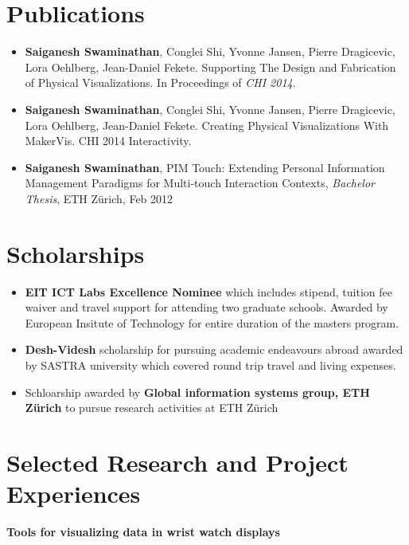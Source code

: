 \documentclass[11pt,a4paper,sans]{moderncv}   %
\begin{document}
\section{Publications}
\begin{itemize}
  \item  \textbf{Saiganesh Swaminathan}, Conglei Shi, Yvonne Jansen, Pierre Dragicevic, Lora Oehlberg, Jean-Daniel Fekete. Supporting The Design and Fabrication of Physical Visualizations. In Proceedings of \textit{CHI 2014}.\\
  
  \item   \textbf{Saiganesh Swaminathan}, Conglei Shi, Yvonne Jansen, Pierre Dragicevic, Lora Oehlberg, Jean-Daniel Fekete. Creating Physical Visualizations With MakerVis. CHI 2014 Interactivity.
  
  \item  \textbf{Saiganesh Swaminathan}, PIM Touch: Extending Personal Information Management Paradigms for Multi-touch Interaction Contexts, \emph{Bachelor Thesis}, ETH Z\"urich, Feb 2012 
  
   
\end{itemize}  

\section{Scholarships}
			\begin{itemize}
			  \item \textbf{\textsf{EIT ICT Labs Excellence Nominee}} which includes stipend, tuition fee waiver and travel support for attending two graduate schools. Awarded by European Insitute of Technology for entire duration of the masters program. 
				\medskip
				\item \textbf{\textsf{Desh-Videsh}} scholarship for pursuing academic endeavours abroad awarded by SASTRA university which covered round trip travel and living expenses.
				\medskip
				\item Schloarship awarded by \textbf{\textsf{Global information systems group, ETH Z\"urich}} to pursue research activities at ETH Z\"urich
			\end{itemize}

\section{Selected Research and Project Experiences}


 {\textbf{\textsf{Tools for visualizing data in wrist watch displays}}}
\end{document}
